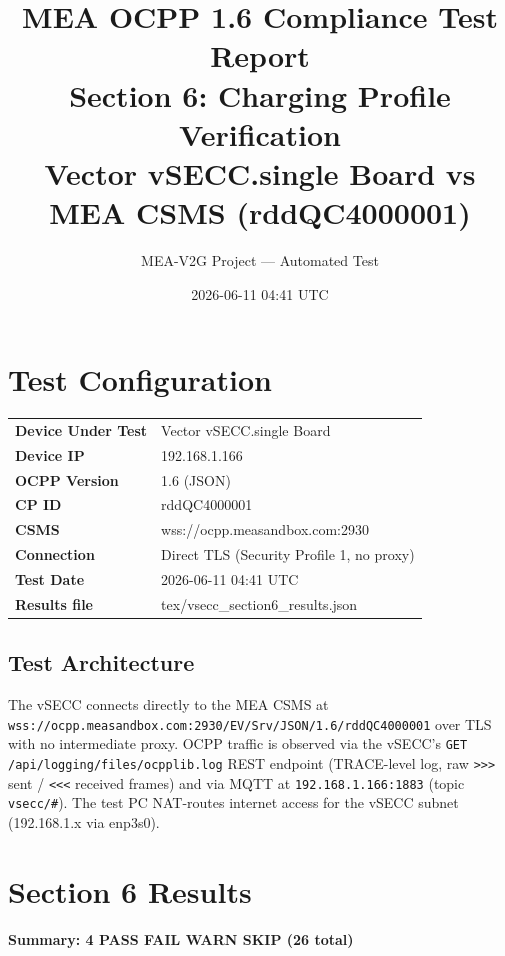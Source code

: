 \documentclass[10pt, a4paper]{article}
\title{\textbf{MEA OCPP 1.6 Compliance Test Report}\\[0.3em]
\large Section 6: Charging Profile Verification\\[0.3em]
\normalsize Vector vSECC.single Board vs MEA CSMS (rddQC4000001)}
\author{MEA-V2G Project --- Automated Test}
\date{2026-06-11 04:41 UTC}
\begin{document}
\maketitle
\tableofcontents
\newpage

\section{Test Configuration}
\begin{tabular}{ll}
\textbf{Device Under Test} & Vector vSECC.single Board \\
\textbf{Device IP}         & 192.168.1.166 \\
\textbf{OCPP Version}      & 1.6 (JSON) \\
\textbf{CP ID}             & rddQC4000001 \\
\textbf{CSMS}              & wss://ocpp.measandbox.com:2930 \\
\textbf{Connection}        & Direct TLS (Security Profile 1, no proxy) \\
\textbf{Test Date}         & 2026-06-11 04:41 UTC \\
\textbf{Results file}      & tex/vsecc\_section6\_results.json \\
\end{tabular}

\subsection*{Test Architecture}
The vSECC connects directly to the MEA CSMS at
\texttt{wss://ocpp.measandbox.com:2930/EV/Srv/JSON/1.6/rddQC4000001}
over TLS with no intermediate proxy.
OCPP traffic is observed via the vSECC's \texttt{GET /api/logging/files/ocpplib.log}
REST endpoint (TRACE-level log, raw \texttt{>>>} sent / \texttt{<<<} received frames)
and via MQTT at \texttt{192.168.1.166:1883} (topic \texttt{vsecc/\#}).
The test PC NAT-routes internet access for the vSECC subnet (192.168.1.x via enp3s0).

\section{Section 6 Results}
\textbf{Summary: 4 PASS  FAIL  WARN  SKIP \quad (26 total)}
\end{document}
